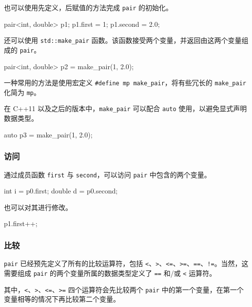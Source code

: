 也可以使用先定义，后赋值的方法完成 \texttt{pair} 的初始化。


\begin{codeline}
pair<int, double> p1;
p1.first = 1;
p1.second = 2.0;
\end{codeline}


还可以使用 \texttt{std::make\_pair} 函数。该函数接受两个变量，并返回由这两个变量组成的 \texttt{pair}。


\begin{codeline}
pair<int, double> p2 = make_pair(1, 2.0);
\end{codeline}


一种常用的方法是使用宏定义 \texttt{\#define\ mp\ make\_pair}，将有些冗长的 \texttt{make\_pair} 化简为 \texttt{mp}。

在 C++11 以及之后的版本中，\texttt{make\_pair} 可以配合 \texttt{auto} 使用，以避免显式声明数据类型。


\begin{codeline}
auto p3 = make_pair(1, 2.0);
\end{codeline}


\subsubsection{访问}\label{ux8bbfux95ee}

通过成员函数 \texttt{first} 与 \texttt{second}，可以访问 \texttt{pair} 中包含的两个变量。


\begin{codeline}
int i = p0.first;
double d = p0.second;
\end{codeline}


也可以对其进行修改。


\begin{codeline}
p1.first++;
\end{codeline}


\subsubsection{比较}\label{ux6bd4ux8f83}

\texttt{pair} 已经预先定义了所有的比较运算符，包括 \texttt{\textless{}}、\texttt{\textgreater{}}、\texttt{\textless{}=}、\texttt{\textgreater{}=}、\texttt{==}、\texttt{!=}。当然，这需要组成 \texttt{pair} 的两个变量所属的数据类型定义了 \texttt{==} 和/或 \texttt{\textless{}} 运算符。

其中，\texttt{\textless{}}、\texttt{\textgreater{}}、\texttt{\textless{}=}、\texttt{\textgreater{}=} 四个运算符会先比较两个 \texttt{pair} 中的第一个变量，在第一个变量相等的情况下再比较第二个变量。


